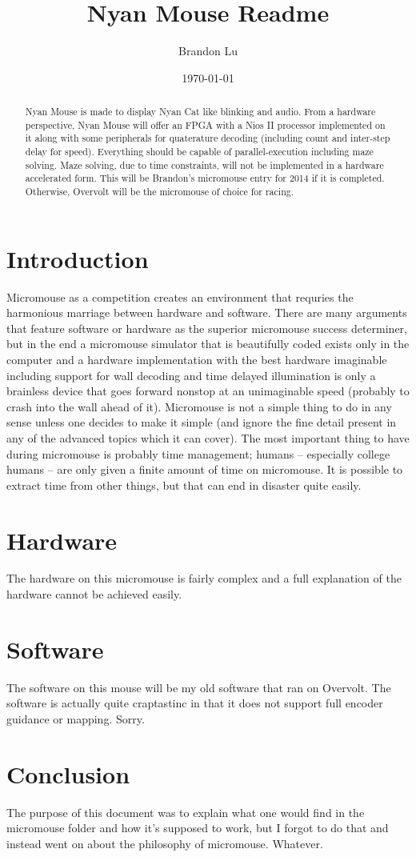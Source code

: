 \documentclass{article}
\begin{document}
\title{Nyan Mouse Readme}
\author {Brandon Lu} \date{\today}
\maketitle
\begin{abstract}
Nyan Mouse is made to display Nyan Cat like blinking and audio.  From a hardware perspective, Nyan Mouse will offer an FPGA with a Nios II processor implemented on it along with some peripherals for quaterature decoding (including count and inter-step delay for speed).  Everything should be capable of parallel-execution including maze solving.  Maze solving, due to time constraints, will not be implemented in a hardware accelerated form.  This will be Brandon's micromouse entry for 2014 if it is completed.  Otherwise, Overvolt will be the micromouse of choice for racing.
\end{abstract}

\section {Introduction}
Micromouse as a competition creates an environment that requries the harmonious marriage between hardware and software.  There are many arguments that feature software or hardware as the superior micromouse success determiner, but in the end a micromouse simulator that is beautifully coded exists only in the computer and a hardware implementation with the best hardware imaginable including support for wall decoding and time delayed illumination is only a brainless device that goes forward nonstop at an unimaginable speed (probably to crash into the wall ahead of it).  Micromouse is not a simple thing to do in any sense unless one decides to make it simple (and ignore the fine detail present in any of the advanced topics which it can cover).  The most important thing to have during micromouse is probably time management; humans -- especially college humans -- are only given a finite amount of time on micromouse.  It is possible to extract time from other things, but that can end in disaster quite easily.

\section {Hardware}
The hardware on this micromouse is fairly complex and a full explanation of the hardware cannot be achieved easily.

\section {Software}
The software on this mouse will be my old software that ran on Overvolt.  The software is actually quite craptastinc in that it does not support full encoder guidance or mapping.  Sorry.

\section {Conclusion}
The purpose of this document was to explain what one would find in the micromouse folder and how it's supposed to work, but I forgot to do that and instead went on about the philosophy of micromouse.  Whatever.
\end{document}
